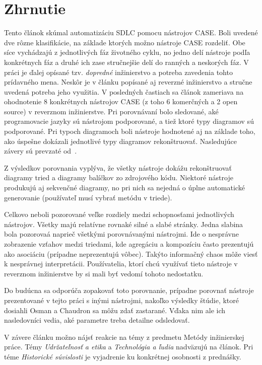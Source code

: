 \documentclass[10pt,twoside,slovak,a4paper]{article}
\begin{document}
\section{Zhrnutie} \label{zhrnutie} 
Tento článok skúmal automatizáciu SDLC pomocu nástrojov CASE. Boli uvedené dve rôzne klasifikácie, na základe ktorých možno nástroje CASE rozdeliť. Obe síce vychádzajú z jednotlivých fáz životného cyklu, no jedno delí nástroje podľa konkrétnych fáz a druhé ich zase stručnejšie delí do ranných a neskorých fáz.
V práci je ďalej opísané tzv. \emph{dopredné} inžinierstvo a potreba zavedenia tohto prídavného mena. Neskôr je v článku popísané aj reverzné inžinierstvo a stručne uvedená potreba jeho využitia. 
V posledných častiach sa článok zameriava na ohodnotenie 8 konkrétnych nástrojov CASE (z  toho 6 komerčných a 2 open source) v reverznom inžinierstve. Pri porovnávaní bolo sledované, aké programovacie jazyky sú nástrojom podporované, a tiež ktoré typy diagramov sú podporované. Pri typoch diagramoch boli nástroje hodnotené aj na základe toho, ako úspešne dokázali jednotlivé typy diagramov rekonštruovať. Nasledujúce závery sú prevzaté od~\cite{Osman:RE}.

Z výsledkov porovnania vyplýva, že všetky nástroje dokážu rekonštruovať diagramy tried a diagramy balíčkov zo zdrojového kódu. Niektoré nástroje produkujú aj sekvenčné diagramy, no pri nich sa nejedná o úplne automatické generovanie (používateľ musí vybrať metódu v triede).

Celkovo neboli pozorované veľke rozdiely medzi schopnosťami jednotlivých nástrojov. Všetky majú relatívne rovnaké silné a slabé stránky. Jedna slabina bola pozorovaá naprieč všetkými porovnávanými nástrojmi. Ide o nesprávne zobrazenie vzťahov medzi triedami, kde agregáciu a kompozíciu často prezentujú ako asociáciu (prípadne neprezentujú vôbec). Takýto informačný chaos môže viesť k nesprávnej interpretácii. Používatelia, ktorí chcú využívať tieto nástroje v reverznom inžinierstve by si mali byť vedomí tohoto nedostatku.

Do budúcna sa odporúča zopakovať toto porovnanie, prípadne porovnať nástroje prezentované v tejto práci s inými nástrojmi, nakoľko výsledky štúdie, ktoré dosiahli Osman a Chaudron sa môžu zdať zastarané. Vďaka nim ale ich nasledovníci vedia, aké parametre treba detailne odsledovať.

V závere článku možno nájsť reakcie na témy z predmetu Metódy inžinierskej práce. Témy \emph{Udržateľnosť a etika} a \emph{Technológia a ľudia} nadväzujú na článok. Pri téme \emph{Historické súvislosti} je vyjadrenie ku konkrétnej osobnosti z prednášky.





\end{document}
